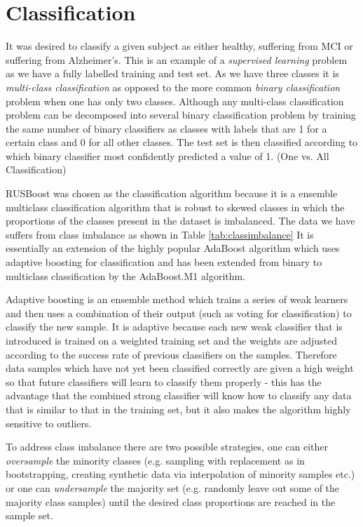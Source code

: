 \clearpage


\section{Classification}

It was desired to classify a given subject as either healthy, suffering from MCI or suffering from Alzheimer's. This is an example of a \textit{supervised learning} problem as we have a fully labelled training and test set. As we have three classes it is \textit{multi-class classification} as opposed to the more common \textit{binary classification} problem when one has only two classes. Although any multi-class classification problem can be decomposed into several binary classification problem by training the same number of binary classifiers as classes with labels that are 1 for a certain class and 0 for all other classes. The test set is then classified according to which binary classifier most confidently predicted a value of 1. (One vs. All Classification) \cite{Witten2011}

RUSBoost was chosen as the classification algorithm because it is a ensemble multiclass classification algorithm that is robust to skewed classes in which the proportions of the classes present in the dataset is imbalanced.\cite{Seiffert2010} The data we have suffers from class imbalance as shown in Table \ref{tab:classimbalance} It is essentially an extension of the highly popular AdaBoost algorithm which uses adaptive boosting for classification and has been extended from binary to multiclass classification by the AdaBoost.M1 algorithm\cite{Witten2011}.

Adaptive boosting is an ensemble method which trains a series of weak learners and then uses a combination of their output (such as voting for classification) to classify the new sample. It is adaptive because each new weak classifier that is introduced is trained on a weighted training set and the weights are adjusted according to the success rate of previous classifiers on the samples. Therefore data samples which have not yet been classified correctly are given a high weight so that future classifiers will learn to classify them properly - this has the advantage that the combined strong classifier will know how to classify any data that is similar to that in the training set, but it also makes the algorithm highly sensitive to outliers.\cite{Witten2011}

To address class imbalance there are two possible strategies, one can either \textit{oversample} the minority classes  (e.g. sampling with replacement as in bootstrapping, creating synthetic data via interpolation of minority samples etc.) or one can \textit{undersample} the majority set (e.g. randomly leave out some of the majority class samples) until the desired class proportions are reached in the sample set.

